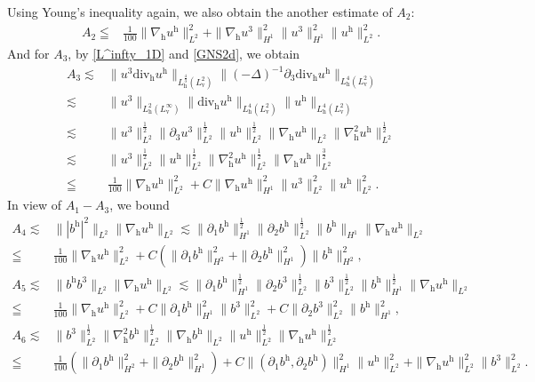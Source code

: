 \documentclass[11pt]{amsart}
\theoremstyle{definition}
\newcommand{\h}{\mathrm{h}}
\newcommand{\nablah}{\nabla_{\mathrm{h}}}
\numberwithin{equation}{section}
\begin{document}
Using  Young's inequality again, we also obtain the another estimate of $A_{2}$:
\begin{align}\label{A2(h)}
	A_{2}\leqq&\frac{1}{100}\|\nablah u^\h\|_{L^2}^2+\|\nablah u^3\|_{H^{1}}^2\|u^3\|_{H^{1}}^2\|u^\h\|_{L^2}^2.
\end{align}
And for $A_{3}$, by \eqref{L^infty_1D} and \eqref{GNS2d}, we obtain
\begin{align}\label{A3}
	A_{3}\lesssim&\|u^3 \mathrm{div_h}u^\h\| _{L^{\frac43}_\h(L^2_\mathrm{v})}\|(-\Delta)^{-1} \partial_3\mathrm{div_h}u^\h\| _{L^{4}_\h(L^2_\mathrm{v})} \nonumber\\
	\lesssim&\|u^3 \|_{L^{2}_\h(L^\infty_\mathrm{v})}\|\mathrm{div_h}u^\h\| _{L^{4}_\h(L^2_\mathrm{v})}\|u^\h\| _{L^{4}_\h(L^2_\mathrm{v})}\nonumber\\
	\lesssim&\|u^3\|_{L^2}^\frac12\|\partial_3u^3\|_{L^2}^\frac12\|u^\h\|_{L^2}^\frac12\|\nablah u^\h\|_{L^2}\|\nablah^2u^\h\|_{L^2}^\frac12\nonumber\\
	\lesssim&\|u^3\|_{L^2}^\frac12\|u^\h\|_{L^2}^\frac12\|\nablah^2u^\h\|_{L^2}^\frac12\|\nablah u^\h\|_{L^2}^\frac32\nonumber\\
	\leqq&\frac{1}{100}\|\nablah u^\h\|_{L^2}^2+C\|\nablah u^\h\|_{H^{1}}^2\|u^3\|_{L^2}^2\|u^\h\|_{L^2}^2.
\end{align}
In view of $A_{1}-A_{3}$, we bound
\begin{align}\label{A4}
	A_{4}\lesssim &\||b^\h|^2\|_{L^2} \|\nablah u^\h\|_{L^2}\lesssim\|\partial_1b^\h\|_{H^1}^\frac12\|\partial_2b^\h\|_{L^{2}}^\frac12\|b^\h\|_{H^{1}}\|\nablah u^\h\|_{L^2} \nonumber\\
	\leqq&\frac{1}{100}\|\nablah u^\h\|_{L^2}^2+C\left(\|\partial_1b^\h\|_{H^2}^2+\|\partial_2b^\h\|_{H^{1}}^2\right)\|b^\h\|_{H^{2}}^2,\\ \label{A5(v)}
	A_{5}\lesssim&\|b^\h b^3\|_{L^2}\|\nablah u^\h\|_{L^2} \lesssim\|\partial_1b^\h\|_{H^1}^\frac12\|\partial_2b^3\|_{L^{2}}^\frac12\|b^3\|_{L^{2}}^\frac12\|b^\h\|_{H^{1}}^\frac12\|\nablah u^\h\|_{L^2}\nonumber\\
	\leqq&\frac{1}{100}\|\nablah u^\h\|_{L^2}^2+C\|\partial_1b^\h\|_{H^1}^2\|b^3\|_{L^{2}}^2+C\|\partial_2b^3\|_{L^{2}}^2\|b^\h\|_{H^{1}}^2,\\
	\label{A6(v)}
	A_{6}\lesssim&\|b^3\|_{L^2}^\frac12\|\nablah^2b^\h\|_{L^2}^\frac12\|\nablah b^\h\|_{L^2}\|u^\h\|_{L^2}^\frac12\|\nablah u^\h\|_{L^2}^\frac12\nonumber\\
	\leqq&\frac{1}{100}\left(\|\partial_1b^\h\|_{H^2}^2 +\|\partial_2b^\h\|_{H^1}^2\right)+C\|(\partial_1b^\h,\partial_2b^\h)\|_{H^1}^2\|u^\h\|_{L^2}^2+\|\nablah u^\h\|_{L^2}^2\|b^3\|_{L^2}^2.
\end{align}
\end{document}
